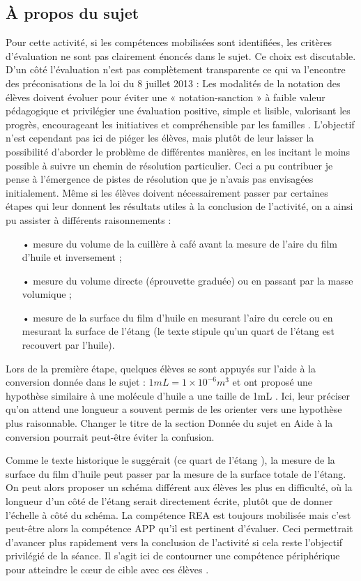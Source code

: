 \documentclass[12pt,a4paper, fleqn]{article}
\newcommand{\app}{\colorbox{bleu_c}{\textcolor{bleu_f}{APP}}}
\newcommand{\rea}{\colorbox{yellow_c}{\textcolor{yellow_f}{REA}}}
\begin{document}
\subsection{À propos du sujet}
\label{sec:sujet}

Pour cette activité, si les compétences mobilisées sont identifiées, les critères d'évaluation ne sont pas clairement énoncés dans le sujet.
Ce choix est discutable.
D'un côté l'évaluation n'est pas complètement transparente  ce qui va l'encontre des préconisations de la loi du 8 juillet 2013 \cite{Loi2013} : \og Les modalités de la notation des élèves doivent évoluer pour éviter une « notation-sanction » à faible valeur pédagogique et privilégier une évaluation positive, simple et lisible, valorisant les progrès, encourageant les initiatives et compréhensible par les familles \fg{}.
L'objectif n'est cependant pas ici de piéger les élèves, mais plutôt de leur laisser la possibilité d'aborder le problème de différentes manières, en les incitant le moins possible à suivre un chemin de résolution particulier.
Ceci a pu contribuer je pense à l'émergence de pistes de résolution que je n'avais pas envisagées initialement.
Même si les élèves doivent nécessairement passer par certaines étapes qui leur donnent les résultats utiles à la conclusion de l'activité, on a ainsi pu assister à différents raisonnements : 
\begin{itemize}
\item[•] mesure du volume de la cuillère à café avant la mesure de l'aire du film d'huile et inversement ;
\item[•] mesure du volume directe (éprouvette graduée) ou en passant par la masse volumique ;
\item[•] mesure de la surface du film d'huile en mesurant l'aire du cercle ou en mesurant la surface de l'étang (le texte stipule qu'un quart de l'étang est recouvert par l'huile).
\end{itemize}

Lors de la première étape, quelques élèves se sont appuyés sur l'aide à la conversion donnée dans le sujet : $\unit{1}{mL} = \unit{1 \times 10^{-6}}{m^3} $ et ont proposé une hypothèse similaire à \og une molécule d'huile a une taille de \unit{1}{mL} \fg{}.
Ici, leur préciser qu'on attend une longueur a souvent permis de les orienter vers une hypothèse plus raisonnable.
Changer le titre de la section \og Donnée \fg{} du sujet en \og Aide à la conversion \fg{} pourrait peut-être éviter la confusion.

Comme le texte historique le suggérait (\og ce quart de l'étang \fg{}), la mesure de la surface du film d'huile peut passer par la mesure de la surface totale de l'étang.
On peut alors proposer un schéma différent aux élèves les plus en difficulté, où la longueur d'un côté de l'étang serait directement écrite, plutôt que de donner l'échelle à côté du schéma.
La compétence \rea{} est toujours mobilisée mais c'est peut-être alors la compétence \app{} qu'il est pertinent d'évaluer.
Ceci permettrait d'avancer plus rapidement vers la conclusion de l'activité si cela reste l'objectif privilégié de la séance.
Il s'agit ici de contourner une compétence périphérique pour atteindre le cœur de cible avec ces élèves \cite{Benoit2012}.
\end{document}

